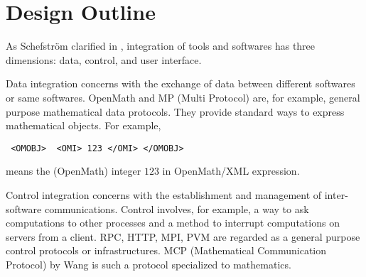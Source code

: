 
\section{Design Outline} 

As Schefstr\"om clarified in \cite{schefstrom},
integration of tools and softwares has three dimensions:
data, control, and user interface.

Data integration concerns with the exchange of data between different
softwares or same softwares.
OpenMath \cite{OpenMath} and MP (Multi Protocol) \cite{GKW} are,
for example, general purpose mathematical data protocols.
They provide standard ways to express mathematical objects.
For example,
\begin{verbatim}
 <OMOBJ>  <OMI> 123 </OMI> </OMOBJ>
\end{verbatim}
means the (OpenMath) integer $123$ in OpenMath/XML expression.

Control integration concerns with the establishment and management of
inter-software communications.
Control involves, for example, a way to ask computations to other processes
and a method to interrupt computations on servers from a client.
RPC, HTTP, MPI, PVM are regarded as a general purpose control protocols or
infrastructures.
MCP (Mathematical Communication Protocol)
by Wang \cite{iamc} is such a protocol specialized to mathematics.

